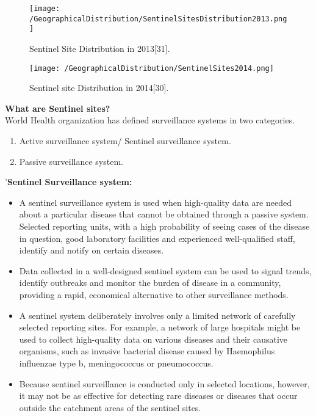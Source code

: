 \documentclass[11pt]{exam}
\begin{document}
\begin{questions}
\begin{enumerate}
\begin{figure}[H]
  \centering
   \texttt{[image: /GeographicalDistribution/SentinelSitesDistribution2013.png]} 
  \caption{Sentinel Site Distribution in 2013[31].}
   \label{Geographical Distribution of DF/DHF Clusters}
\end{figure} 

\begin{figure}[H]
  \centering
   \texttt{[image: /GeographicalDistribution/SentinelSites2014.png]} 
  \caption{Sentinel site Distribution in 2014[30].}
   \label{Geographical Distribution of DF/DHF Clusters}
\end{figure} 

\newpage
\textbf{What are Sentinel sites?}\\
World Health organization has defined surveillance systems in two categories.
\begin{enumerate}
\item Active surveillance system/ Sentinel surveillance system.
\item Passive surveillance system. \newline
\end{enumerate} 

'\textbf{Sentinel Surveillance system:}\\
\begin{itemize}
\item A sentinel surveillance system is used when high-quality data are needed about a particular disease that cannot be obtained through a passive system. Selected reporting units, with a high probability of seeing cases of the disease in question, good laboratory facilities and experienced well-qualified staff, identify and notify on certain diseases. 
\item Data collected in a well-designed sentinel system can be used to signal trends, identify outbreaks and monitor the burden of disease in a community, providing a rapid, economical alternative to other surveillance methods. 
\item A sentinel system deliberately involves only a limited network of carefully selected reporting sites. For example, a network of large hospitals might be used to collect high-quality data on various diseases and their causative organisms, such as invasive bacterial disease caused by Haemophilus influenzae type b, meningococcus or pneumococcus.
\item Because sentinel surveillance is conducted only in selected locations, however, it may not be as effective for detecting rare diseases or diseases that occur outside the catchment areas of the sentinel sites.\newline
\end{itemize}


\end{enumerate}
\end{questions}
\end{document}
